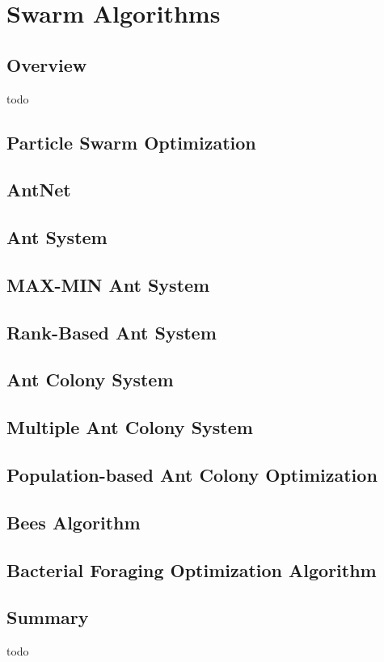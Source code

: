 


\chapter{Swarm Algorithms}
\label{ch:swarm}

\section{Overview}
todo



\newpage\section{Particle Swarm Optimization}
\newpage\section{AntNet}
\newpage\section{Ant System}
\newpage\section{MAX-MIN Ant System}
\newpage\section{Rank-Based Ant System}
\newpage\section{Ant Colony System}
\newpage\section{Multiple Ant Colony System}
\newpage\section{Population-based Ant Colony Optimization}
\newpage\section{Bees Algorithm}
\newpage\section{Bacterial Foraging Optimization Algorithm}
\newpage

\section{Summary}
todo
